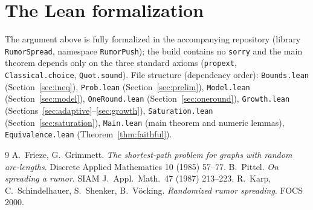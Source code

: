\section{The Lean formalization}\label{sec:lean}

The argument above is fully formalized in the accompanying repository
(library \texttt{RumorSpread}, namespace \texttt{RumorPush}); the build
contains no \texttt{sorry} and the main theorem depends only on the three
standard axioms (\texttt{propext}, \texttt{Classical.choice},
\texttt{Quot.sound}). File structure (dependency order):
\texttt{Bounds.lean} (Section~\ref{sec:ineq}), \texttt{Prob.lean}
(Section~\ref{sec:prelim}), \texttt{Model.lean}
(Section~\ref{sec:model}), \texttt{OneRound.lean}
(Section~\ref{sec:oneround}), \texttt{Growth.lean}
(Sections~\ref{sec:adaptive}--\ref{sec:growth}), \texttt{Saturation.lean}
(Section~\ref{sec:saturation}), \texttt{Main.lean} (main theorem and
numeric lemmas), \texttt{Equivalence.lean} (Theorem~\ref{thm:faithful}).

\begin{thebibliography}{9}
 A.~Frieze, G.~Grimmett.
\emph{The shortest-path problem for graphs with random arc-lengths}.
Discrete Applied Mathematics 10 (1985) 57--77.
 B.~Pittel.
\emph{On spreading a rumor}. SIAM J.\ Appl.\ Math.\ 47 (1987) 213--223.
 R.~Karp, C.~Schindelhauer, S.~Shenker, B.~V\"ocking.
\emph{Randomized rumor spreading}. FOCS 2000.
\end{thebibliography}
